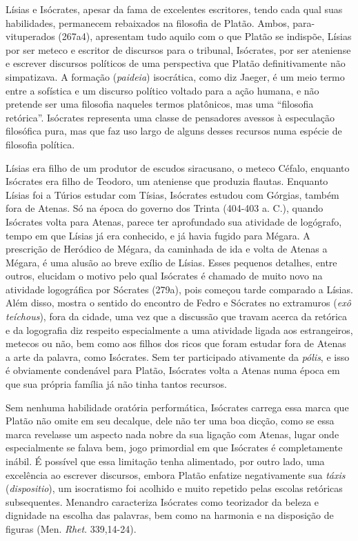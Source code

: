 Lísias e Isócrates, apesar da fama de excelentes escritores, tendo cada
qual suas habilidades, permanecem rebaixados na filosofia de Platão.
Ambos, para-vituperados (267a4), apresentam tudo aquilo com o que Platão
se indispõe, Lísias por ser meteco e escritor de discursos para o
tribunal, Isócrates, por ser ateniense e escrever discursos políticos de
uma perspectiva que Platão definitivamente não simpatizava. A formação
(\emph{paideia}) isocrática, como diz Jaeger, é um meio termo entre a
sofística e um discurso político voltado para a ação humana, e não
pretende ser uma filosofia naqueles termos platônicos, mas uma
``filosofia retórica''. Isócrates representa uma classe de pensadores
avessos à especulação filosófica pura, mas que faz uso largo de alguns
desses recursos numa espécie de filosofia política.

Lísias era filho de um produtor de escudos siracusano, o meteco Céfalo,
enquanto Isócrates era filho de Teodoro, um ateniense que produzia
flautas. Enquanto Lísias foi a Túrios estudar com Tísias, Isócrates
estudou com Górgias, também fora de Atenas. Só na época do governo dos
Trinta (404-403 a. C.), quando Isócrates volta para Atenas, parece ter
aprofundado sua atividade de logógrafo, tempo em que Lísias já era
conhecido, e já havia fugido para Mégara. A prescrição de Heródico de
Mégara, da caminhada de ida e volta de Atenas a Mégara, é uma alusão ao
breve exílio de Lísias. Esses pequenos detalhes, entre outros, elucidam
o motivo pelo qual Isócrates é chamado de muito novo na atividade
logográfica por Sócrates (279a), pois começou tarde comparado a Lísias.
Além disso, mostra o sentido do encontro de Fedro e Sócrates no
extramuros (\emph{exô teíchous}), fora da cidade, uma vez que a
discussão que travam acerca da retórica e da logografia diz respeito
especialmente a uma atividade ligada aos estrangeiros, metecos ou não,
bem como aos filhos dos ricos que foram estudar fora de Atenas a arte da
palavra, como Isócrates. Sem ter participado ativamente da \emph{pólis},
e isso é obviamente condenável para Platão, Isócrates volta a Atenas
numa época em que sua própria família já não tinha tantos recursos.

Sem nenhuma habilidade oratória performática, Isócrates carrega essa
marca que Platão não omite em seu decalque, dele não ter uma boa dicção,
como se essa marca revelasse um aspecto nada nobre da sua ligação com
Atenas, lugar onde especialmente se falava bem, jogo primordial em que
Isócrates é completamente inábil. É possível que essa limitação tenha
alimentado, por outro lado, uma excelência ao escrever discursos, embora
Platão enfatize negativamente sua \emph{táxis} (\emph{dispositio}), um
isocratismo foi acolhido e muito repetido pelas escolas retóricas
subsequentes. Menandro caracteriza Isócrates como teorizador da beleza e
dignidade na escolha das palavras, bem como na harmonia e na disposição
de figuras (Men. \emph{Rhet}. 339,14-24).

